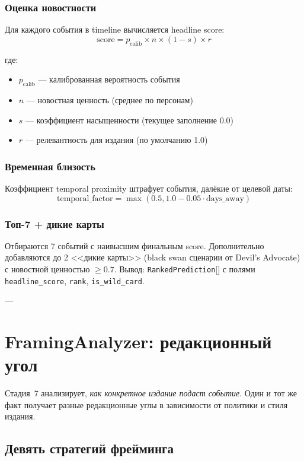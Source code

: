 \subsubsection{Оценка новостности}

Для каждого события в timeline вычисляется headline score:
\begin{equation}
\text{score} = p_{\text{calib}} \times n \times (1 - s) \times r
\label{eq:headline-score}
\end{equation}

где:
\begin{itemize}
  \item $p_{\text{calib}}$ — калиброванная вероятность события
  \item $n$ — новостная ценность (среднее по персонам)
  \item $s$ — коэффициент насыщенности (текущее заполнение 0.0)
  \item $r$ — релевантность для издания (по умолчанию 1.0)
\end{itemize}

\subsubsection{Временная близость}

Коэффициент temporal proximity штрафует события, далёкие от целевой даты:
\[
\text{temporal\_factor} = \max(0.5, 1.0 - 0.05 \cdot \text{days\_away})
\]

\subsubsection{Топ-7 + дикие карты}

Отбираются 7 событий с наивысшим финальным score. Дополнительно добавляются до 2 <<дикие карты>> (black swan сценарии от Devil's Advocate) с новостной ценностью $\geq 0.7$. Вывод: \verb|RankedPrediction|[] с полями \verb|headline_score|, \verb|rank|, \verb|is_wild_card|.

---

\section{FramingAnalyzer: редакционный угол}
\label{sec:framing}

Стадия~7 анализирует, \emph{как конкретное издание подаст событие}. Один и тот же факт получает разные редакционные углы в зависимости от политики и стиля издания.

\subsection{Девять стратегий фрейминга}

